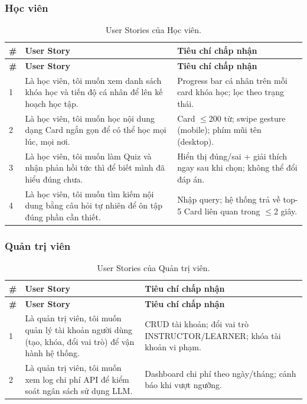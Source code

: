 \subsubsection{Học viên}

\begin{longtable}{|p{0.5cm}|p{6cm}|p{8cm}|}
    \caption{User Stories của Học viên.} \label{tab:us-learner} \\
    \hline
    \textbf{\#} & \textbf{User Story} & \textbf{Tiêu chí chấp nhận} \\
    \hline
    \endfirsthead \hline
    \textbf{\#} & \textbf{User Story} & \textbf{Tiêu chí chấp nhận} \\
    \hline \endhead

    1 & Là học viên, tôi muốn xem danh sách khóa học và tiến độ cá nhân để
        lên kế hoạch học tập. &
        Progress bar cá nhân trên mỗi card khóa học; lọc theo trạng thái. \\ \hline

    2 & Là học viên, tôi muốn học nội dung dạng Card ngắn gọn để có thể
        học mọi lúc, mọi nơi. &
        Card $\leq$200 từ; swipe gesture (mobile); phím mũi tên (desktop). \\ \hline

    3 & Là học viên, tôi muốn làm Quiz và nhận phản hồi tức thì để biết
        mình đã hiểu đúng chưa. &
        Hiển thị đúng/sai + giải thích ngay sau khi chọn; không thể đổi đáp án. \\ \hline

    4 & Là học viên, tôi muốn tìm kiếm nội dung bằng câu hỏi tự nhiên
        để ôn tập đúng phần cần thiết. &
        Nhập query; hệ thống trả về top-5 Card liên quan trong $\leq$2 giây. \\ \hline
\end{longtable}

\subsubsection{Quản trị viên}

\begin{longtable}{|p{0.5cm}|p{6cm}|p{8cm}|}
    \caption{User Stories của Quản trị viên.} \label{tab:us-admin} \\
    \hline
    \textbf{\#} & \textbf{User Story} & \textbf{Tiêu chí chấp nhận} \\
    \hline
    \endfirsthead \hline
    \textbf{\#} & \textbf{User Story} & \textbf{Tiêu chí chấp nhận} \\
    \hline \endhead

    1 & Là quản trị viên, tôi muốn quản lý tài khoản người dùng (tạo, khóa,
        đổi vai trò) để vận hành hệ thống. &
        CRUD tài khoản; đổi vai trò INSTRUCTOR/LEARNER; khóa tài khoản vi phạm. \\ \hline

    2 & Là quản trị viên, tôi muốn xem log chi phí API để kiểm soát ngân
        sách sử dụng LLM. &
        Dashboard chi phí theo ngày/tháng; cảnh báo khi vượt ngưỡng. \\ \hline
\end{longtable}

